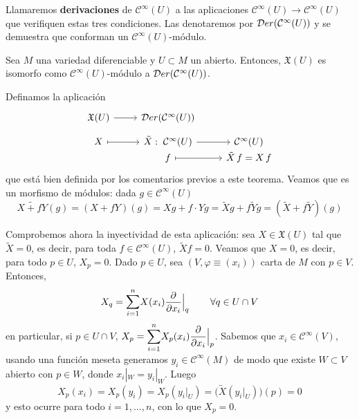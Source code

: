 \begin{defi}
Llamaremos \textbf{derivaciones} de $\mathcal{C}^{\infty}(U)$ a las aplicaciones $\mathcal{C}^{\infty}(U) \to \mathcal{C}^{\infty}(U)$ que verifiquen estas tres condiciones. Las denotaremos por $\mathcal{D}er(\mathcal{C}^{\infty}(U))$ y se demuestra que conforman un $\mathcal{C}^{\infty}(U)$-módulo.
\end{defi}

\begin{teo}
Sea $M$ una variedad diferenciable y $U \subset M$ un abierto. Entonces, $\mathfrak{X}(U)$ es isomorfo como $\mathcal{C}^{\infty}(U)$-módulo a $\mathcal{D}er(\mathcal{C}^{\infty}(U))$.
\end{teo}
\begin{dem}
Definamos la aplicación
$$\begin{tikzcd}
\mathfrak{X}(U) \arrow{r} & \mc Der(\mathcal{C}^{\infty}(U))\\[-4mm]
X \arrow[mapsto]{r} & \tilde{X}:\; \mathcal{C}^{\infty}(U) \arrow{r} & \mathcal{C}^{\infty}(U)\\[-7mm]
& f \arrow[mapsto]{r} & \tilde{X}\,f = X\,f
\end{tikzcd}$$
que está bien definida por los comentarios previos a este teorema. Veamos que es un morfismo de módulos: dada $g \in \mathcal{C}^{\infty}(U)$
$$\widetilde{X + fY}(g) = (X + fY)(g) = Xg + f\cdot Yg = \tilde{X}g + f\tilde{Y}g = (\tilde{X} + f\tilde{Y})(g)$$

Comprobemos ahora la inyectividad de esta aplicación: sea $X \in \mathfrak{X}(U)$ tal que $\tilde{X} = 0$, es decir, para toda $f \in \mathcal{C}^{\infty}(U)$, $\tilde{X}f = 0$. Veamos que $X = 0$, es decir, para todo $p \in U$, $X_p = 0$. Dado $p \in U$, sea $(V,\varphi\equiv (x_i))$ carta de $M$ con $p\in V$. Entonces, 
$$X_{q} = \mathlarger\sum_{i=1}^n X(x_i) \dfrac{\partial}{\partial x_i}\Big|_{q} \qquad \, \forall q \in U \cap V $$
en particular, si $p \in U\cap V$, $X_p =  \mathlarger\sum_{i=1}^n X_p(x_i) \dfrac{\partial}{\partial x_i}\Big|_p$. Sabemos que $x_i \in \mathcal{C}^{\infty}(V)$, usando una función meseta generamos $y_i \in \mathcal{C}^{\infty}(M)$ de modo que existe $W \subset V$ abierto con $p \in W$, donde $x_i|_W = y_i|_W$. Luego
$$X_p(x_i) = X_p(y_i) = X_p(y_i|_U) = \Big(\tilde{X}(y_i|_U)\Big)(p) = 0$$
y esto ocurre para todo $i = 1,\dots,n$, con lo que $X_p = 0$.


\end{dem}
